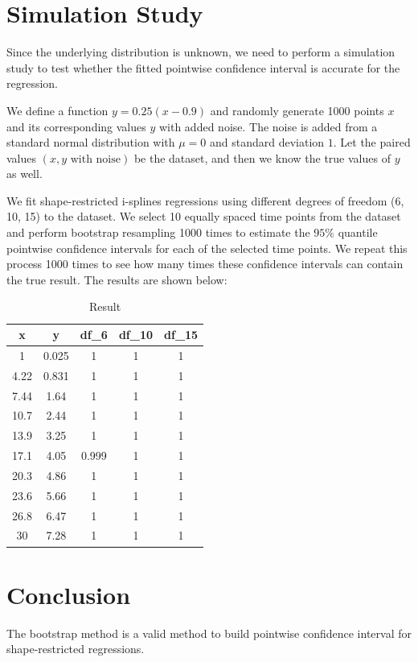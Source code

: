 \documentclass[12pt]{article}
\begin{document}
\section{Simulation Study}
\label{Simulation Study}

Since the underlying distribution is unknown, we need to perform a simulation study to test whether the fitted pointwise confidence interval is accurate for the regression.

We define a function \(y = 0.25(x - 0.9)\) and randomly generate 1000 points \(x\) and its corresponding values \(y\) with added noise. The noise is added from a standard normal distribution with \(\mu = 0\) and standard deviation \(1\). Let the paired values \((x, y\text{ with noise})\) be the dataset, and then we know the true values of \(y\) as well.

We fit shape-restricted i-splines regressions using different degrees of freedom (6, 10, 15) to the dataset. We select 10 equally spaced time points from the dataset and perform bootstrap resampling 1000 times to estimate the \(95\%\) quantile pointwise confidence intervals for each of the selected time points. We repeat this process 1000 times to see how many times these confidence intervals can contain the true result. The results are shown below:



\begin{table}[ht]
  \centering
  \caption{Result}
\begin{tabular}{|c|c|c|c|c|}
    \hline
\textbf{x} & \textbf{y} & \textbf{df\_6} & \textbf{df\_10} & \textbf{df\_15} \\
    \hline
    1 & 0.025 & 1 & 1 & 1 \\
    \hline
    4.22 & 0.831 & 1 & 1 & 1 \\
    \hline
    7.44 & 1.64 & 1 & 1 & 1 \\
    \hline
    10.7 & 2.44 & 1 & 1 & 1 \\
    \hline
    13.9 & 3.25 & 1 & 1 & 1 \\
    \hline
    17.1 & 4.05 & 0.999 & 1 & 1 \\
    \hline
    20.3 & 4.86 & 1 & 1 & 1 \\
    \hline
    23.6 & 5.66 & 1 & 1 & 1 \\
    \hline
    26.8 & 6.47 & 1 & 1 & 1 \\
    \hline
    30 & 7.28 & 1 & 1 & 1 \\
    \hline
  \end{tabular}
\end{table}


\section{Conclusion}
\label{Conclusion}

The bootstrap method is a valid method to build pointwise confidence interval for shape-restricted regressions.



\end{document}

